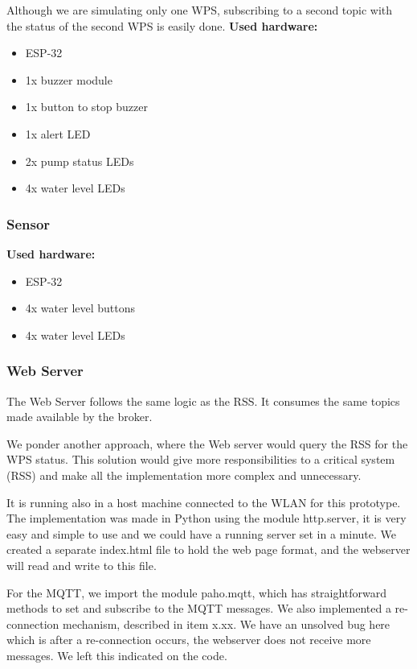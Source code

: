\documentclass[11pt]{article}
\begin{document}
Although we are simulating only one WPS, subscribing to a second topic with the status of the second WPS is easily done.
\newline
\newline
\noindent
\textbf{Used hardware:}
\begin{itemize}
	\item ESP-32
	\item 1x buzzer module
	\item 1x button to stop buzzer
	\item 1x alert LED
	\item 2x pump status LEDs
	\item 4x water level LEDs
\end{itemize}

\subsubsection{Sensor}
\noindent
\textbf{Used hardware:}
\begin{itemize}
	\item ESP-32
	\item 4x water level buttons
	\item 4x water level LEDs
\end{itemize}

\subsubsection{Web Server}

The Web Server follows the same logic as the RSS. It consumes the same topics made available by the broker.

We ponder another approach, where the Web server would query the RSS for the WPS status. This solution would give more responsibilities to a critical system (RSS) and make all the implementation more complex and unnecessary.

It is running also in a host machine connected to the WLAN for this prototype.
The implementation was made in Python using the module http.server, it is very easy and simple to use and we could have a running server set in a minute.
We created a separate index.html file to hold the web page format, and the webserver will read and write to this file.

For the MQTT, we import the module paho.mqtt, which has straightforward methods to set and subscribe to the MQTT messages. We also implemented a re-connection mechanism, described in item x.xx. We have an unsolved bug here which is after a re-connection occurs, the webserver does not receive more messages. We left this indicated on the code.
\end{document}
